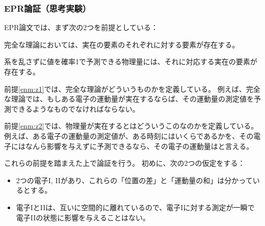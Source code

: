 \documentclass[10pt,b5paper,papersize,dvipdfmx]{jsbook}
\begin{document}
%
\subsubsection{EPR論証（思考実験）} %

EPR論文では、まず次の2つを前提としている：
\begin{enumerate}[{label=[\arabic*]}]
  \item 完全な理論においては、実在の要素のそれぞれに対する要素が存在する。\label{enm:z1}
  \item 系を乱さずに値を確率1で予測できる物理量には、それに対応する実在の要素が存在する。\label{enm:z2}
\end{enumerate}
\par
前提\ref{enm:z1}では、完全な理論がどういうものかを定義している。
例えば、完全な理論では、もしある電子の運動量が実在するならば、その運動量の測定値を予測できるようなものでなければならない。\par
前提\ref{enm:z2}では、物理量が実在するとはどういうこのなのかを定義している。
例えば、ある電子の運動量の測定値が、ある時刻にはいくらであるかを、その電子にはなんら影響を与えずに予測できるなら、その電子の運動量はと言える。
\par
これらの前提を踏まえた上で論証を行う。
初めに、次の2つの仮定をする：
\begin{itemize}
  \item 2つの電子I, IIがあり、これらの「位置の差」と「運動量の和」は分かっているとする。
  \item 電子IとIIは、互いに空間的に離れているので、電子Iに対する測定が一瞬で電子IIの状態に影響を与えることはない。
\end{itemize}
\end{document}

